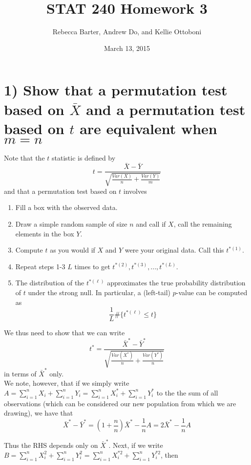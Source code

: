 \documentclass[11pt]{article}
\title{STAT 240 Homework 3}
\author{Rebecca Barter, Andrew Do, and Kellie Ottoboni}
\date{March 13, 2015} %
\begin{document}
\maketitle


\section*{1) Show that a permutation test based on $\bar{X}$ and a permutation test based on $t$ are equivalent when $m = n$} %

\noindent Note that the $t$ statistic is defined by
$$t = \frac{\bar{X} - \bar{Y}}{\sqrt{\frac{Var(X)}{n} + \frac{Var(Y)}{m}}}$$
\noindent and that a permutation test based on $t$ involves
\begin{enumerate}
\item Fill a box with the observed data.
\item Draw a simple random sample of size $n$ and call if $X$, call the remaining elements in the box $Y$.
\item Compute $t$ as you would if $X$ and $Y$ were your original data. Call this $t^{*(1)}$.
\item Repeat steps 1-3 $L$ times to get $t^{*(2)}, t^{*(3)}, ..., t^{*(L)}$.
\item The distribution of the $t^{*(\ell)}$ approximates the true probability distribution of $t$ under the strong null. In particular, a (left-tail) $p$-value can be computed as
$$\frac{1}{L} \# \{t^{*(\ell)} \leq t\}$$
\end{enumerate}

\noindent We thus need to show that we can write
$$t^* = \frac{\bar{X}^* - \bar{Y}^*}{\sqrt{\frac{Var(X^*)}{n} + \frac{Var(Y^*)}{n}}}$$
\noindent in terms of $\bar{X}^*$ only.\\


\noindent We note, however, that if we simply write $A = \sum_{i=1}^n X_i + \sum_{i=1}^n Y_i   = \sum_{i=1}^n X_i^* + \sum_{i=1}^n Y_i^*$ to the the sum of all observations (which can be considered our new population from which we are drawing), we have that
$$\bar{X}^* - \bar{Y}^* = \left(1 + \frac{n}{n} \right) \bar{X}^* - \frac1n A = 2 \bar{X}^* - \frac1n A $$

\noindent Thus the RHS depends only on $\bar{X}^*$. Next, if we write $B =\sum_{i=1}^n X_i^2 + \sum_{i=1}^n Y_i^2 = \sum_{i=1}^n X_i^{*2} +\sum_{i=1}^n Y_i^{*2}$, then 
\end{document}
